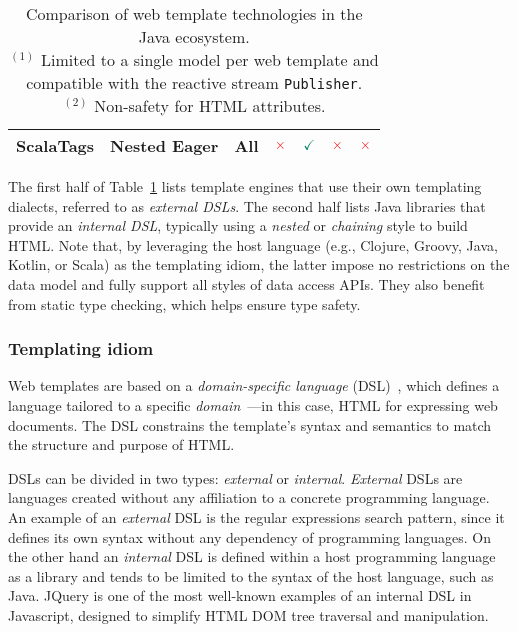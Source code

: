 \begin{table}[h]
\begin{tabular}{|c|c|c|c|c|c|c|}
    \\
    \hline
    \textbf{ScalaTags}
     & Nested Eager
     & All
     & \large{$\textcolor{red}{\times}$}
     & \large{$\textcolor{PineGreen}{\checkmark}$}
     & \large{$\textcolor{red}{\times}$}
     & \large{$\textcolor{red}{\times}$}
    \\
    \hline
  \end{tabular}
  \caption{
    Comparison of web template technologies in the Java ecosystem.
    \\$^{(1)}$ Limited to a single model per web template and compatible with
    the reactive stream \texttt{Publisher}.
    \\$^{(2)}$ Non-safety for HTML attributes.
  }
  \label{table:cmplibs}
\end{table}

The first half of Table~\ref{table:cmplibs} lists template engines that use
their own templating dialects, referred to as \textit{external DSLs}. The
second half lists Java libraries that provide an \textit{internal DSL},
typically using a \textit{nested} or \textit{chaining} style to build HTML.
Note that, by leveraging the host language (e.g., Clojure, Groovy, Java,
Kotlin, or Scala) as the templating idiom, the latter impose no restrictions on
the data model and fully support all styles of data access APIs. They also
benefit from static type checking, which helps ensure type safety.


\subsubsection{Templating idiom}

Web templates are based on a \textit{domain-specific language}
(DSL)~\cite{landin1966next}, which defines a language tailored to a specific
\textit{domain}~\cite{evans2004domain}—in this case, HTML for expressing web
documents. The DSL constrains the template's syntax and semantics to match the
structure and purpose of HTML.

DSLs can be divided in two types: \textit{external} or
\textit{internal}\cite{dslbook}. \textit{External} DSLs are languages created
without any affiliation to a concrete programming language. An example of an
\textit{external} DSL is the regular expressions search
pattern\cite{thompson1968}, since it defines its own syntax without any
dependency of programming languages. On the other hand an \textit{internal} DSL
is defined within a host programming language as a library and tends to be
limited to the syntax of the host language, such as Java.
JQuery\cite{resig2007pro} is one of the most well-known examples of an internal
DSL in Javascript, designed to simplify HTML DOM\cite{dom} tree traversal and
manipulation.

